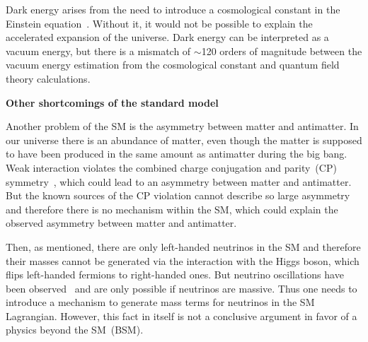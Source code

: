 Dark energy arises from the need to introduce a cosmological constant in the Einstein equation~\cite{Sami:2009jx}. Without it, it would not be possible to explain the accelerated expansion of the universe. Dark energy can be interpreted as a vacuum energy, but there is a mismatch of $\sim$120 orders of magnitude between the vacuum energy estimation from the cosmological constant and quantum field theory calculations.



\textbf{Other shortcomings of the standard model}

Another problem of the SM is the asymmetry between matter and antimatter. In our universe there is an abundance of matter, even though the matter is supposed to have been produced in the same amount as antimatter during the big bang.  Weak interaction violates the combined charge conjugation and parity~(CP) symmetry~\cite{Kobayashi:1973fv}, which could lead to an asymmetry between matter and antimatter. But the known sources of the CP violation cannot describe so large asymmetry and therefore there is no mechanism within the SM, which could explain the observed asymmetry between matter and antimatter.

Then, as mentioned, there are only left-handed neutrinos in the SM and therefore their masses cannot be generated via the interaction with the Higgs boson, which flips left-handed fermions to right-handed ones. But neutrino oscillations have been observed~\cite{Fukuda:1998mi, Ahmad:2001an} and are only possible if neutrinos are massive. Thus one needs to introduce a mechanism to generate mass terms for neutrinos in the SM Lagrangian. However, this fact in  itself is not a conclusive argument in favor of a physics beyond the SM~(BSM).

